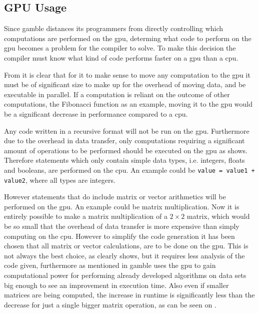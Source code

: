 \subsection*{GPU Usage}\label{GPUCode}
Since \gls{gamble} distances its programmers from directly controlling which computations are performed on the \acrshort{gpu}, determing what code to perform on the \acrshort{gpu} becomes a problem for the compiler to solve.
To make this decision the compiler must know what kind of code performs faster on a \acrshort{gpu} than a \acrshort{cpu}.

From  it is clear that for it to make sense to move any computation to the \acrshort{gpu} it must be of significant size to make up for the overhead of moving data, and be executable in parallel.
If a computation is reliant on the outcome of other computations, the Fibonacci function as an example, moving it to the \acrshort{gpu} would be a significant decrease in performance compared to a \acrshort{cpu}.

Any code written in a recursive format will not be run on the \acrshort{gpu}. 
Furthermore due to the overhead in data transfer, only computations requiring a significant amount of operations to be performed should be executed on the \acrshort{gpu} as  shows.
Therefore statements which only contain simple data types, i.e. integers, floats and booleans, are performed on the \acrshort{cpu}.
An example could be \texttt{value = value1 + value2}, where all types are integers.

However statements that do include matrix or vector arithmetics will be performed on the \acrshort{gpu}.
An example could be matrix multiplication.
Now it is entirely possible to make a matrix multiplication of a $2\times2$ matrix, which would be so small that the overhead of data transfer is more expensive than simply computing on the \acrshort{cpu}. 
However to simplify the code generation it has been chosen that all matrix or vector calculations, are to be done on the \acrshort{gpu}.
This is not always the best choice, as  clearly shows, but it requires less analysis of the code given, furthermore as mentioned in  \gls{gamble} uses the \acrshort{gpu} to gain computational power for performing already developed algorithms on data sets big enough to see an improvement in execution time.
Also even if smaller matrices are being computed, the increase in runtime is significantly less than the decrease for just a single bigger matrix operation, as can be seen on .

